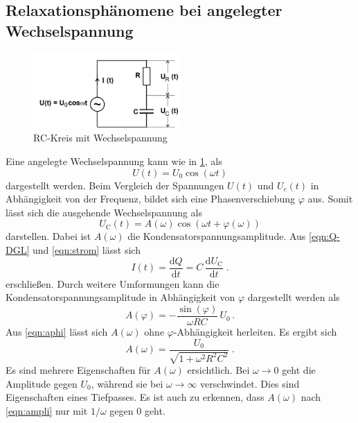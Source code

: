 \subsection{Relaxationsphänomene bei angelegter Wechselspannung}
\begin{figure}
    \centering
    \caption{RC-Kreis mit Wechselspannung} 
    \label{fig:Wechs}
    \includegraphics[width = 0.5\textwidth]{pics/wechselspannung-RC.png}
\end{figure}
Eine angelegte Wechselspannung kann wie in \ref{fig:Wechs}, als 
\begin{equation*}
    U(t)=U_0 \cos(\omega t)
\end{equation*}
dargestellt werden. Beim Vergleich der Spannungen $U(t)$ und $U_c(t)$ in Abhängigkeit von der Frequenz, bildet sich eine Phasenverschiebung $\varphi$ aus.
Somit lässt sich die ausgehende Wechselspannung als
\begin{equation}
    U_\text{C}(t)= A(\omega) \cos (\omega t + \varphi (\omega))
\end{equation}
darstellen. Dabei ist $A(\omega)$ die Kondensatorspannungsamplitude.
Aus \eqref{eqn:Q-DGL} und \eqref{eqn:strom} lässt sich
\begin{equation}
    \label{eqn:strom}
    I(t)= \frac{\text{d}Q}{\text{d}t}=C\, \frac{\text{d}U_\text{C}}{\text{d}t}\; \text{.}
\end{equation}
erschließen. 
Durch weitere Umformungen kann die Kondensatorspannungsamplitude in Abhängigkeit von $\varphi$ dargestellt werden als 
\begin{equation}
    \label{eqn:aphi}
    A(\varphi)=-\frac{\sin (\varphi)}{\omega RC}\, U_0 \, .
\end{equation}
Aus \eqref{eqn:aphi} lässt sich $A(\omega)$ ohne $\varphi$-Abhängigkeit herleiten. Es ergibt sich
\begin{equation}
    \label{eqn:ampli}
    A(\omega)=\frac{U_0}{\sqrt{1+\omega^2 R^2 C^2}} \; \text{.}
\end{equation}
Es sind mehrere Eigenschaften für $A(\omega)$ ersichtlich. Bei $\omega \rightarrow 0$ geht die Amplitude gegen $U_0$, während sie bei 
$\omega \rightarrow \infty$ verschwindet. Dies sind Eigenschaften eines Tiefpasses. Es ist auch zu erkennen, dass $A(\omega)$ nach \eqref{eqn:ampli}
nur mit $1/\omega$ gegen $0$ geht.
